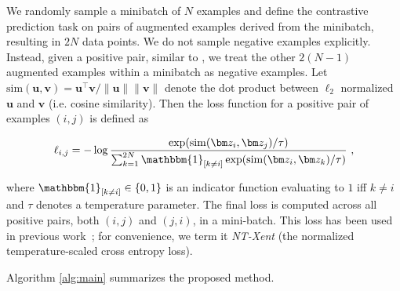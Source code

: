 We randomly sample a minibatch of $N$ examples and define the contrastive prediction task on pairs of augmented examples derived from the minibatch, resulting in $2N$ data points. We do not sample negative examples explicitly. Instead, given a positive pair, similar to \cite{chen2017sampling}, we treat the other $2(N-1)$ augmented examples within a minibatch as negative examples. Let $\mathrm{sim}(\bm u,\bm v) = \bm u^\top \bm v / \lVert\bm u\rVert \lVert\bm v\rVert$ denote the dot product between $\ell_2$ normalized $\bm u$ and $\bm v$ (i.e. cosine similarity). Then the loss function for a positive pair of examples $(i, j)$ is defined as

\begin{equation}
\label{eq:loss}
    \ell_{i,j} = -\log \frac{\exp(\mathrm{sim}(\bm z_i, \bm z_j)/\tau)}{\sum_{k=1}^{2N} \mathbbm{1}_{[k \neq i]}\exp(\mathrm{sim}(\bm z_i, \bm z_k)/\tau)}~,
\end{equation}

where $\mathbbm{1}_{[k \neq i]} \in \{ 0,  1\}$ is an indicator function evaluating to $1$ iff $k \neq i$ and $\tau$ denotes a temperature parameter. The final loss is computed across all positive pairs, both $(i, j)$ and $(j, i)$, in a mini-batch. This loss has been used in previous work~\cite{sohn2016improved,wu2018unsupervised,oord2018representation}; for convenience, we term it \textit{NT-Xent} (the normalized temperature-scaled cross entropy loss).

Algorithm \ref{alg:main} summarizes the proposed method.

